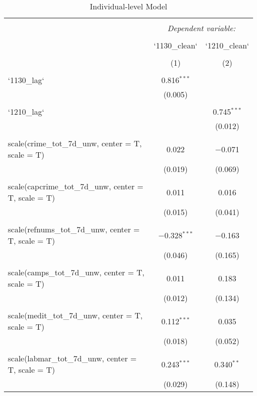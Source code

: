 
\begin{table}[!htbp] \centering 
  \caption{Individual-level Model} 
  \label{} 
\begin{tabular}{@{\extracolsep{5pt}}lcc} 
\\[-1.8ex]\hline 
\hline \\[-1.8ex] 
 & \multicolumn{2}{c}{\textit{Dependent variable:}} \\ 
\cline{2-3} 
\\[-1.8ex] & `1130\_clean` & `1210\_clean` \\ 
\\[-1.8ex] & (1) & (2)\\ 
\hline \\[-1.8ex] 
 `1130\_lag` & 0.816$^{***}$ &  \\ 
  & (0.005) &  \\ 
  & & \\ 
 `1210\_lag` &  & 0.745$^{***}$ \\ 
  &  & (0.012) \\ 
  & & \\ 
 scale(crime\_tot\_7d\_unw, center = T, scale = T) & 0.022 & $-$0.071 \\ 
  & (0.019) & (0.069) \\ 
  & & \\ 
 scale(capcrime\_tot\_7d\_unw, center = T, scale = T) & 0.011 & 0.016 \\ 
  & (0.015) & (0.041) \\ 
  & & \\ 
 scale(refnums\_tot\_7d\_unw, center = T, scale = T) & $-$0.328$^{***}$ & $-$0.163 \\ 
  & (0.046) & (0.165) \\ 
  & & \\ 
 scale(camps\_tot\_7d\_unw, center = T, scale = T) & 0.011 & 0.183 \\ 
  & (0.012) & (0.134) \\ 
  & & \\ 
 scale(medit\_tot\_7d\_unw, center = T, scale = T) & 0.112$^{***}$ & 0.035 \\ 
  & (0.018) & (0.052) \\ 
  & & \\ 
 scale(labmar\_tot\_7d\_unw, center = T, scale = T) & 0.243$^{***}$ & 0.340$^{**}$ \\ 
  & (0.029) & (0.148) \\ 

\end{tabular}
\end{table}
